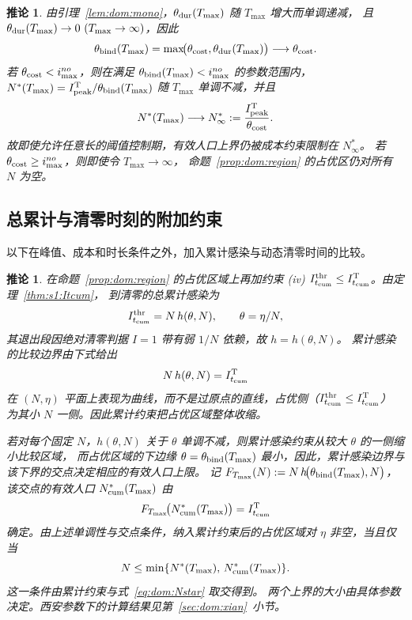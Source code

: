 \documentclass[UTF8,a4paper,10pt,fontset=fandol]{ctexart}
\theoremstyle{cnplain}
\newtheorem{corollaryn}[theorem]{推论}
\theoremstyle{remark}
\newcommand{\Itcum}{I_{t_{\mathrm{cum}}}}
\numberwithin{equation}{section}
\begin{document}
\begin{corollaryn}\label{cor:ceiling}
由引理~\ref{lem:dom:mono}，$\theta_{\rm dur}(T_{\max})$ 随 $T_{\max}$ 增大而单调递减，
且 $\theta_{\rm dur}(T_{\max})\to0\ (T_{\max}\to\infty)$，因此
\[
  \theta_{\rm bind}(T_{\max})
  =
  \max\!\bigl(
    \theta_{\rm cost},
    \theta_{\rm dur}(T_{\max})
  \bigr)
  \longrightarrow
  \theta_{\rm cost}.
\]
若 $\theta_{\rm cost}<i_{\max}^{no}$，则在满足 $\theta_{\rm bind}(T_{\max})<i_{\max}^{no}$
的参数范围内，$N^\ast(T_{\max})=I_{\rm peak}^{\rm T}/\theta_{\rm bind}(T_{\max})$
随 $T_{\max}$ 单调不减，并且
\[
  N^\ast(T_{\max})
  \longrightarrow
  N^\ast_\infty
  :=
  \frac{I_{\rm peak}^{\rm T}}
       {\theta_{\rm cost}}.
\]
故即使允许任意长的阈值控制期，有效人口上界仍被成本约束限制在 $N^\ast_\infty$。
若 $\theta_{\rm cost}\ge i_{\max}^{no}$，则即使令 $T_{\max}\to\infty$，
命题~\ref{prop:dom:region} 的占优区仍对所有 $N$ 为空。
\end{corollaryn}

\subsection{总累计与清零时刻的附加约束}
\label{sec:dom:extensive}

以下在峰值、成本和时长条件之外，加入累计感染与动态清零时间的比较。

\begin{corollaryn}\label{cor:cum}
在命题~\ref{prop:dom:region} 的占优区域上再加约束
(iv) $\Itcum^{\rm thr}\le\Itcum^{\rm T}$。由定理~\ref{thm:s1:Itcum}，
到清零的总累计感染为
\[
  \Itcum^{\rm thr}=N\,h(\theta,N),\qquad \theta=\eta/N,
\]
其退出段因绝对清零判据 $I=1$ 带有弱 $1/N$ 依赖，故 $h=h(\theta,N)$。
累计感染的比较边界由下式给出
\begin{equation}
  N\,h(\theta,N)=\Itcum^{\rm T}
  \label{eq:dom:cum-feasible}
\end{equation}
在 $(N,\eta)$ 平面上表现为曲线，而不是过原点的直线，占优侧（$\Itcum^{\rm thr}\le\Itcum^{\rm T}$）
为其小 $N$ 一侧。因此累计约束把占优区域整体收缩。

若对每个固定 $N$，$h(\theta,N)$ 关于 $\theta$ 单调不减，则累计感染约束从较大 $\theta$ 的一侧缩小比较区域，
而占优区域的下边缘 $\theta=\theta_{\rm bind}(T_{\max})$ 最小，因此，累计感染边界与该下界的交点决定相应的有效人口上限。
记 $F_{T_{\max}}(N):=N\,h\!\bigl(\theta_{\rm bind}(T_{\max}),N\bigr)$，该交点的有效人口
$N_{\rm cum}^\ast(T_{\max})$ 由
\begin{equation}
  F_{T_{\max}}\!\bigl(N_{\rm cum}^\ast(T_{\max})\bigr)=\Itcum^{\rm T}
  \label{eq:dom:Ncumstar}
\end{equation}
确定。由上述单调性与交点条件，纳入累计约束后的占优区域对 $\eta$ 非空，当且仅当
\[
N\le\min\{N^\ast(T_{\max}),\,N_{\rm cum}^\ast(T_{\max})\}.
\]
这一条件由累计约束与式~\eqref{eq:dom:Nstar} 取交得到。
两个上界的大小由具体参数决定。西安参数下的计算结果见第~\ref{sec:dom:xian}~小节。
\end{corollaryn}
\end{document}
